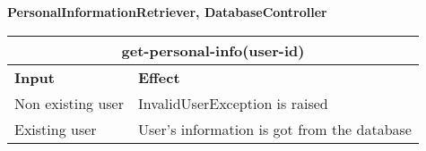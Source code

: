 \textbf{PersonalInformationRetriever, DatabaseController}\\
\begin{tabular}{|p{5cm}|p{7cm}|}
\hline
\multicolumn{2}{|c|}{get-personal-info(user-id)} \\
\hline
\textbf{Input} & \textbf{Effect} \\

\hline
Non existing user & InvalidUserException is raised \\

\hline
Existing user & User's information is got from the database \\
\hline
\end{tabular}
